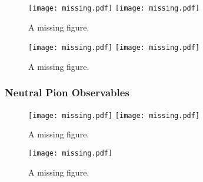 \documentclass[../main.tex]{subfiles}
\begin{document}
\begin{figure}[H]
    \center
    \texttt{[image: missing.pdf]}
    \texttt{[image: missing.pdf]}
    \caption[text]{A missing figure.}
    \label{fig:ph_obs1}
\end{figure}

\begin{figure}[H]
    \center
    \texttt{[image: missing.pdf]}
    \texttt{[image: missing.pdf]}
    \caption[text]{A missing figure.}
    \label{fig:ph_obs2}
\end{figure}

\subsubsection{Neutral Pion Observables}
\begin{figure}[H]
    \center
    \texttt{[image: missing.pdf]}
    \texttt{[image: missing.pdf]}
    \caption[text]{A missing figure.}
    \label{fig:pi0_obs0}
\end{figure}

\begin{figure}[H]
    \center
    \texttt{[image: missing.pdf]}
    \caption[text]{A missing figure.}
    \label{fig:pi0_obs1}
\end{figure}
\end{document}
